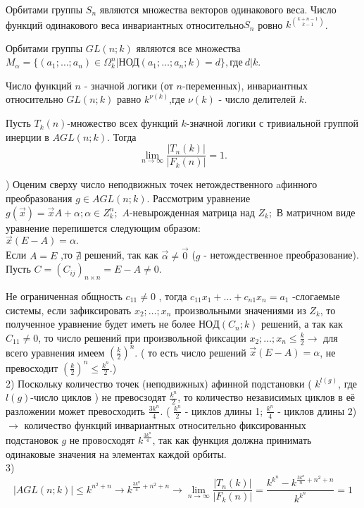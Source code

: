 Орбитами группы $S_n$ являются множества векторов одинакового веса. Число функций одинакового веса инвариантных относительно$ S_n$ ровно $k^{k+n-1 \choose k-1}$.

\thr Орбитами группы $GL(n;k)$ являются все множества $M_\alpha=\{(a_1;\dots;a_n)\in \Omega_k^n|\mathrm{\text{НОД}}(a_1;\dots;a_n;k)=d\}, \text{где}\   d|k$.
                   
\conseq Число функций $n$ - значной логики (от $n$-переменных), инвариантных относительно $GL(n;k)$ равно $k^{\nu(k)}$,где $\nu(k)$ - число делителей $k$.

\thr
Пусть $T_k(n)$-множество всех функций $k$-значной логики с тривиальной группой инерции в $AGL(n;k)$. Тогда
$$
\lim_{n\to\infty} \frac{|T_n(k)|}{|F_k(n)|}=1.
$$

) Оценим сверху число неподвижных точек нетождественного aфинного преобразования $g \in AGL(n;k)$.  Рассмотрим уравнение $g(\vec{x})=\vec{x}A+\alpha;\alpha \in Z_k^n;$ $A$-невырожденная матрица над $Z_k;$ В матричном виде уравнение перепишется следующим образом:\\
$\vec{x}(E-A)=\alpha. $\\
Если $A=E$ ,то $\nexists$ решений, так как $\vec{\alpha}\neq \vec{0}$ ($g$ - нетождественное преобразование). Пусть $ C=(C_{ij})_{n \times n} = E-A \neq 0 $.

Не ограниченная общность $c_{11} \neq 0 $ , тогда $ c_{11} x_1 + \ldots + c_{n1} x_n = a_1 $ -слогаемые системы, если зафиксировать $x_2;\dots;x_n $ произвольными значениями из $Z_k $, то полученное уравнение будет иметь не более $НОД(C_n;k) $ решений, а так как $C_{11} \neq 0$, то число решений при произвольной фиксации $x_2;\dots;x_n \leqslant \frac{k}{2} \rightarrow $ для всего уравнения имеем $ (\frac {k}{2})^n$. ( то есть число решений $\vec{x}(E-A) = \alpha $, не превосходит $(\frac {k}{2})^n \leqslant \frac {k^n}{2} $.)\\
2) Поскольку количество точек (неподвижных) афинной подстановки ( $ k^{l(g)} $, где $l(g)$-число циклов ) не превосзодят $\frac {k^n}{2} $, то количество независимых циклов в её разложении может превосходить $\frac {3k^n}{4} $. ( $\frac {k^n}{2} $ - циклов длины 1; $\frac {k^n}{4} $ - циклов длины 2)\\
$\rightarrow $ количество функций инвариантных относительно фиксированных подстановок $g$ не провосходят $k^{\frac{3k^n}{4}}$, так как функция должна принимать одинаковые значения на элементах каждой орбиты. \\
3) $$
|AGL(n;k)| \leqslant k^{n^2+n} \rightarrow k^{\frac{3k^n}{4} +n^2 +n} \rightarrow \lim_{n\to\infty} \frac{|T_n(k)|}{|F_k(n)|} = \frac {k^{k^n}-k^{\frac {3k^n}{n}+n^2+n}}{k^{k^n}}=1
$$

